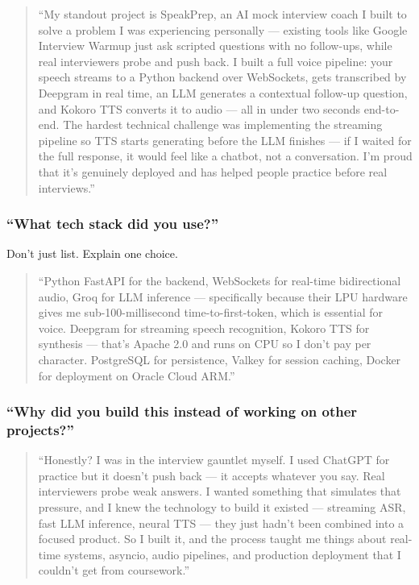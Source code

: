 \documentclass[
  11pt,
]{article}
\begin{document}
\begin{quote}
``My standout project is SpeakPrep, an AI mock interview coach I built
to solve a problem I was experiencing personally --- existing tools like
Google Interview Warmup just ask scripted questions with no follow-ups,
while real interviewers probe and push back. I built a full voice
pipeline: your speech streams to a Python backend over WebSockets, gets
transcribed by Deepgram in real time, an LLM generates a contextual
follow-up question, and Kokoro TTS converts it to audio --- all in under
two seconds end-to-end. The hardest technical challenge was implementing
the streaming pipeline so TTS starts generating before the LLM finishes
--- if I waited for the full response, it would feel like a chatbot, not
a conversation. I'm proud that it's genuinely deployed and has helped
people practice before real interviews.''
\end{quote}

\hypertarget{what-tech-stack-did-you-use}{%
\subsubsection{``What tech stack did you
use?''}\label{what-tech-stack-did-you-use}}

Don't just list. Explain one choice.

\begin{quote}
``Python FastAPI for the backend, WebSockets for real-time bidirectional
audio, Groq for LLM inference --- specifically because their LPU
hardware gives me sub-100-millisecond time-to-first-token, which is
essential for voice. Deepgram for streaming speech recognition, Kokoro
TTS for synthesis --- that's Apache 2.0 and runs on CPU so I don't pay
per character. PostgreSQL for persistence, Valkey for session caching,
Docker for deployment on Oracle Cloud ARM.''
\end{quote}

\hypertarget{why-did-you-build-this-instead-of-working-on-other-projects}{%
\subsubsection{``Why did you build this instead of working on other
projects?''}\label{why-did-you-build-this-instead-of-working-on-other-projects}}

\begin{quote}
``Honestly? I was in the interview gauntlet myself. I used ChatGPT for
practice but it doesn't push back --- it accepts whatever you say. Real
interviewers probe weak answers. I wanted something that simulates that
pressure, and I knew the technology to build it existed --- streaming
ASR, fast LLM inference, neural TTS --- they just hadn't been combined
into a focused product. So I built it, and the process taught me things
about real-time systems, asyncio, audio pipelines, and production
deployment that I couldn't get from coursework.''
\end{quote}
\end{document}
